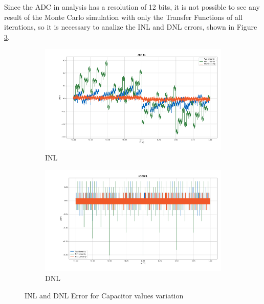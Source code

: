 Since the ADC in analysis has a resolution of 12 bits, it is not possible to see any result of the Monte Carlo simulation with only the Transfer Functions of all iterations, so it is necessary to analize the INL and DNL errors, shown in Figure \ref{fig:NL_ALLCAPS}.

\begin{figure}[H]
    \centering
    \begin{subfigure}[b]{0.8\textwidth}
        \centering
        \includegraphics[width=\textwidth]{Images/INL_All_Caps_20Ksim_s0011.png}
        \caption{INL}
        \label{fig:INL_ALLCAPS}
    \end{subfigure}%
    
    \begin{subfigure}[b]{0.8\textwidth}
        \centering
        \includegraphics[width=\textwidth]{Images/DNL_All_Caps_20Ksim_s0011.png}
        \caption{DNL}
        \label{fig:DNL_ALLCAPS}
    \end{subfigure}
    \caption{INL and DNL Error for Capacitor values variation}
    \label{fig:NL_ALLCAPS}
\end{figure}

